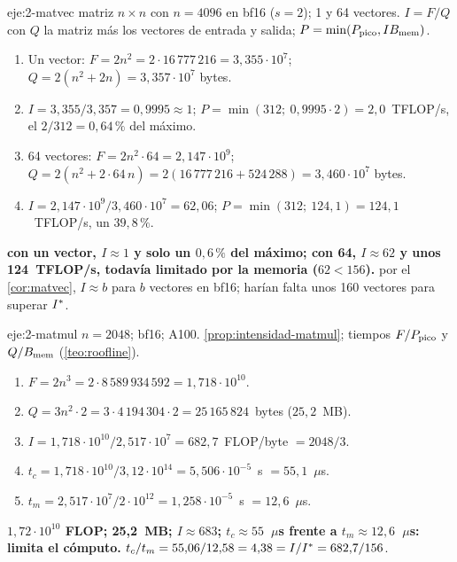 \begin{solucion}{eje:2-matvec}
\datos matriz $n\times n$ con $n=4096$ en bf16 ($s=2$); 1 y 64 vectores.
\planteamiento $I=F/Q$ con $Q$ la matriz más los vectores de entrada y salida; $P=\min(P_{\mathrm{pico}},IB_{\mathrm{mem}})$.
\pasos
\begin{enumerate}[label=\arabic*.]
  \item Un vector: $F=2n^{2}=2\cdot 16\,777\,216=3{,}355\cdot 10^{7}$; $Q=2(n^{2}+2n)=3{,}357\cdot 10^{7}$ bytes.
  \item $I=3{,}355/3{,}357=0{,}9995\approx 1$; $P=\min(312;\ 0{,}9995\cdot 2)=2{,}0$~TFLOP/s, el $2/312=0{,}64\,\%$ del máximo.
  \item 64 vectores: $F=2n^{2}\cdot 64=2{,}147\cdot 10^{9}$; $Q=2(n^{2}+2\cdot 64\,n)=2(16\,777\,216+524\,288)=3{,}460\cdot 10^{7}$ bytes.
  \item $I=2{,}147\cdot 10^{9}/3{,}460\cdot 10^{7}=62{,}06$; $P=\min(312;\ 124{,}1)=124{,}1$~TFLOP/s, un $39{,}8\,\%$.
\end{enumerate}
\resultado \textbf{con un vector, $I\approx 1$ y solo un $0{,}6\,\%$ del máximo; con 64, $I\approx 62$ y unos 124~TFLOP/s, todavía limitado por la memoria ($62<156$).}
\comprobacion por el \cref{cor:matvec}, $I\approx b$ para $b$ vectores en bf16; harían falta unos 160 vectores para superar $I^{\ast}$.
\end{solucion}

\begin{solucion}{eje:2-matmul}
\datos $n=2048$; bf16; A100.
\planteamiento \cref{prop:intensidad-matmul}; tiempos $F/P_{\mathrm{pico}}$ y $Q/B_{\mathrm{mem}}$ (\cref{teo:roofline}).
\pasos
\begin{enumerate}[label=\arabic*.]
  \item $F=2n^{3}=2\cdot 8\,589\,934\,592=1{,}718\cdot 10^{10}$.
  \item $Q=3n^{2}\cdot 2=3\cdot 4\,194\,304\cdot 2=25\,165\,824$~bytes ($25{,}2$~MB).
  \item $I=1{,}718\cdot 10^{10}/2{,}517\cdot 10^{7}=682{,}7$~FLOP/byte $=2048/3$.
  \item $t_c=1{,}718\cdot 10^{10}/3{,}12\cdot 10^{14}=5{,}506\cdot 10^{-5}$~s $=55{,}1$~$\mu$s.
  \item $t_m=2{,}517\cdot 10^{7}/2\cdot 10^{12}=1{,}258\cdot 10^{-5}$~s $=12{,}6$~$\mu$s.
\end{enumerate}
\resultado \textbf{$1{,}72\cdot 10^{10}$ FLOP; 25{,}2~MB; $I\approx 683$; $t_c\approx 55$~$\mu$s frente a $t_m\approx 12{,}6$~$\mu$s: limita el cómputo.}
\comprobacion $t_c/t_m=55{,}06/12{,}58=4{,}38=I/I^{\ast}=682{,}7/156$.
\end{solucion}

